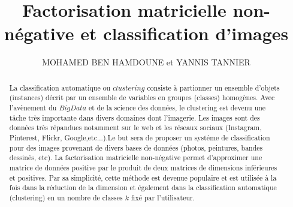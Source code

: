 \documentclass[runningheads]{llncs}
\begin{document}


\title{Factorisation matricielle non-n\'egative et classification d'images}

\author{MOHAMED BEN HAMDOUNE et YANNIS TANNIER}




\maketitle

\begin{abstract}
La classification automatique ou $clustering$ consiste \`a partionner un ensemble d'objets (instances) d\'ecrit par un ensemble de variables en groupes (classes) homog\`enes. Avec l'av\`enement du $Big Data$ et de la science des donn\'ees, le clustering est devenu une t\^ache tr\`es importante dans divers domaines dont l'imagerie. Les images sont des donn\'ees tr\`es r\'epandues notamment sur le web et les r\'eseaux sociaux (Instagram, Pinterest, Flickr, Google,etc...).Le but sera de proposer un syst\'eme de classification pour des images provenant de divers bases de donn\'ees (photos, peintures, bandes dessin\'es, etc). La factorisation matricielle non-n\'egative permet d'approximer une matrice de donn\'ees positive par le produit de deux matrices de dimensions inf\'erieures et positives. Par sa simplicit\'e, cette m\'ethode est devenue populaire et est utilis\'ee \`a la fois dans la r\'eduction de la dimension et \'egalement dans la classification automatique (clustering) en un nombre de classes $k$ fix\'e par l'utilisateur. 
\end{abstract}

\setcounter{tocdepth}{3}
\setcounter{secnumdepth}{3}
\tableofcontents
\newpage
\end{document}
